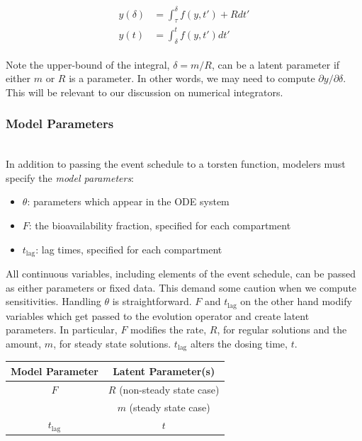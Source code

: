 \documentclass[11pt]{amsart}
\begin{document}
\begin{eqnarray}
  \begin{aligned}
  y(\delta) &= \int_\tau ^ \delta f(y, t') + R dt' \\
  y(t) &= \int_\delta ^ t f(y, t') dt'
  \end{aligned}
\end{eqnarray}

Note the upper-bound of the integral, $\delta = m / R$, can be a latent parameter if either $m$ or
$R$ is a parameter. In other words, we may need to compute $\partial y / \partial \delta$. This will
be relevant to our discussion on numerical integrators.


\subsubsection{Model Parameters}\label{modelParms} \ \\

In addition to passing the event schedule to a torsten function, modelers must specify the 
\textit{model parameters}:
\begin{itemize}
  \item $\theta$: parameters which appear in the ODE system
  \item $F$: the bioavailability fraction, specified for each compartment
  \item $t_\mathrm{lag}$: lag times, specified for each compartment
\end{itemize}

All continuous variables, including elements of the event schedule, can be passed as either 
parameters or fixed data. This demand some caution when we compute sensitivities. Handling 
$\theta$ is straightforward.  $F$ and $t_\mathrm{lag}$ on the other hand modify variables which
get passed to the evolution operator and create latent parameters. In particular, $F$ modifies 
the rate, $R$, for regular solutions and the amount, $m$, for steady state solutions.
$t_\mathrm{lag}$ alters the dosing time, $t$. \ \\

\begin{center}
  \begin{tabular}{c | c}
  Model Parameter & Latent Parameter(s) \\
  \hline
    $F$ & $R$ (non-steady state case) \\
         &  $m$  (steady state case) \\ 
   \hline
  $t_\mathrm{lag}$ & $t$ \\
  \end{tabular} \\
\end{center}
\end{document}
